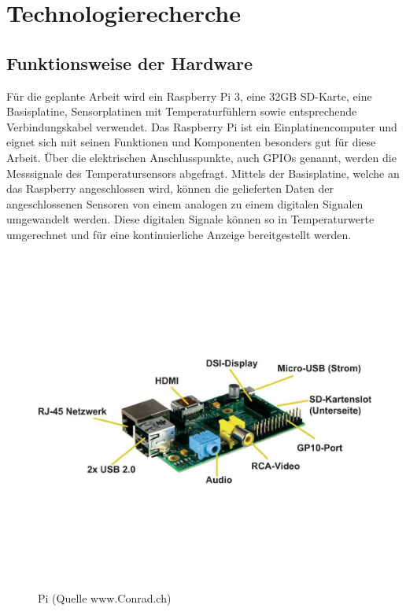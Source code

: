 \section{Technologierecherche}
\subsection{Funktionsweise der Hardware}
Für die geplante Arbeit wird ein Raspberry Pi 3, eine 32GB SD-Karte, eine Basisplatine, Sensorplatinen mit Temperaturfühlern sowie entsprechende Verbindungskabel verwendet. Das Raspberry Pi ist ein Einplatinencomputer und eignet sich mit seinen Funktionen und Komponenten besonders gut für diese Arbeit. Über die elektrischen Anschlusspunkte, auch GPIOs genannt, werden die Messsignale des Temperatursensors abgefragt. Mittels der Basisplatine, welche an das Raspberry angeschlossen wird, können die gelieferten Daten der angeschlossenen Sensoren von einem analogen zu einem digitalen Signalen umgewandelt werden.
Diese digitalen Signale können so in Temperaturwerte umgerechnet und für eine kontinuierliche Anzeige bereitgestellt werden.

\begin{figure}[H]%
\centering
\includegraphics[width=1\textwidth]{Images/RaspberryPi.jpg}
\caption{Pi (Quelle www.Conrad.ch)}
\label{fig:raspi}
\end{figure}

